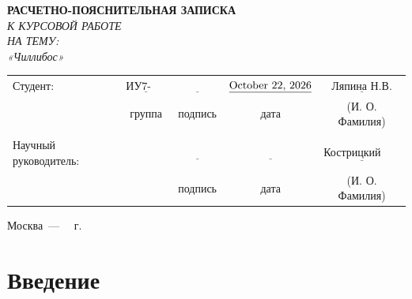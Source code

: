 \documentclass[letterpaper,12pt]{article}
\begin{document}
		
		\begin{center}
			\LARGE\textbf{РАСЧЕТНО-ПОЯСНИТЕЛЬНАЯ ЗАПИСКА}\\
			\LARGE\textit{К КУРСОВОЙ РАБОТЕ}\\
			\LARGE\textit{НА ТЕМУ: }\\
			\LARGE\textit{«Чиллибос»}
		\end{center}
		
		\noindent\newline\newline\newline\newline\newline
		\noindent\newline\newline
		
		
		\begin{tabular}{lcccc}
			Студент: & $\underline{\text{ИУ7-42Б}}$ & $\underline{\text{~~~~~~~~~~~}}$ & $\underline{\text{\today}}$ & $\underline{\text{Ляпина Н.В.}}$ \\
			& \footnotesize группа & \footnotesize подпись & \footnotesize дата  & \footnotesize (И. О. Фамилия) \\
			&  &  &  & \\
			Научный руководитель: & \textbf{} & $\underline{\text{~~~~~~~~~~~}}$ & $\underline{\text{~~~~~~~~~~~~}}$ & $\underline{\text{Кострицкий А.С.}}$ \\
			&  & \footnotesize подпись & \footnotesize дата  & \footnotesize (И. О. Фамилия) \\
		\end{tabular}
		
		
		
		\begin{center}
			\vfill
			Москва~---~\the\year
			~г.
		\end{center}
		\clearpage

		\begin{center}
			\tableofcontents
		\end{center}
		\clearpage
		\section*{Введение}
\end{document}
